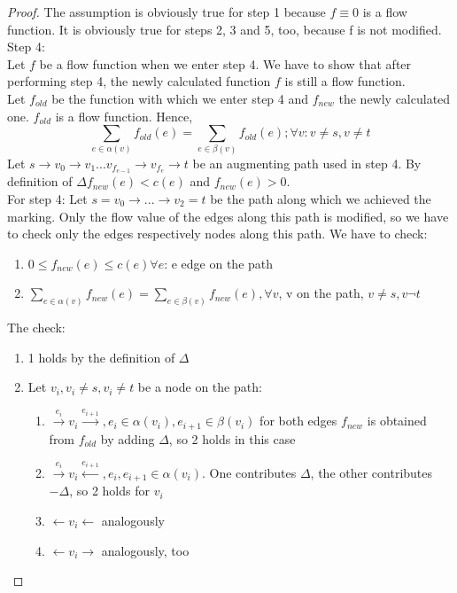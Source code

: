 \begin{proof}
The assumption is obviously true for step 1 because $f \equiv 0$ is a flow function. It is obviously true for steps 2, 3 and 5, too, because f is not modified. \\
Step 4: \\
Let $f$ be a flow function when we enter step 4. We have to show that after performing step 4, the newly calculated function $f$ is still a flow function. \\
Let $f_{old}$ be the function with which we enter step 4 and $f_{new}$ the newly calculated one. $f_{old}$ is a flow function. Hence, 
\[\sum_{e \in \alpha(v)} f_{old}(e) = \sum_{e \in \beta(v)}f_{old}(e); \forall v : v \neq s, v \neq t\]
Let $s \rightarrow v_0 \rightarrow v_1 ... v_{f_{e-1}} \rightarrow v_{f_e} \rightarrow t$ be an augmenting path used in step 4. By definition of $\Delta f_{new}(e) < c(e)$ and $f_{new}(e) > 0$. \\
For step 4: Let $s = v_0 \rightarrow ... \rightarrow v_2 = t$ be the path along which we achieved the marking. Only the flow value of the edges along this path is modified, so we have to check only the edges respectively nodes along this path. We have to check: 
\begin{enumerate}
\item $ 0 \le f_{new}(e) \le c(e) \forall e$: e edge on the path
\item $\sum_{e \in \alpha(v)} f_{new}(e) = \sum_{e \in \beta(v)}f_{new}(e),  \forall v$, v on the path, $v \neq s, v \neg t$ 
\end{enumerate}
The check: 
\begin{enumerate}
\item 1 holds by the definition of $\Delta$
\item Let $v_i, v_i \neq s, v_i \neq t$ be a node on the path:
\begin{enumerate}
\item $\xrightarrow{e_i} v_i \xrightarrow{e_{i+1}}, e_i \in \alpha(v_i), e_{i+1} \in \beta(v_i)$ for both edges $f_{new}$ is obtained from $f_{old}$ by adding $\Delta$, so 2 holds in this case
\item $\xrightarrow{e_i} v_i \xleftarrow{e_{i+1}}, e_i, e_{i+1} \in \alpha(v_i)$. One contributes $\Delta$, the other contributes $-\Delta$, so 2 holds for $v_i$
\item $\leftarrow v_i \leftarrow$ analogously
\item $\leftarrow v_i \rightarrow$ analogously, too
\end{enumerate}
\end{enumerate}
\end{proof}

